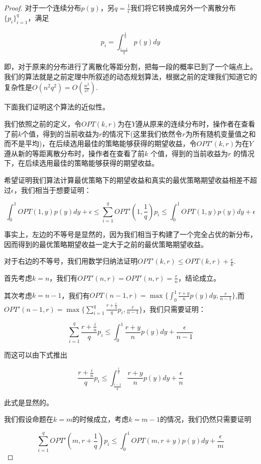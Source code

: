 \documentclass[bachelor]{thuthesis}
\begin{document}
\begin{proof}

对于一个连续分布$p(y)$，另$q=\frac{1}{\epsilon}$我们将它转换成另外一个离散分布$\{p_i\}_{i=1}^{q}$，满足

\[p_i=\int_{\frac{i-1}{q}}^{\frac{i}{q}}p(y)dy\]

即，对于原来的分布进行了离散化等距分割，把每一段的概率已到了一个端点上。我们的算法就是之前定理中所叙述的动态规划算法，根据之前的定理我们知道它的复杂性是$O(n^2q^2)=O(\frac{n^2}{\epsilon^2})$.

下面我们证明这个算法的近似性。

我们依照之前的定义，令$OPT(k,r)$为在$Y$遵从原来的连续分布时，操作者在查看了前$k$个值，得到的当前收益为$r$的情况下(这里我们依然令$r$为所有随机变量值之和而不是平均)，在后续选用最佳的策略能够获得的期望收益，令$OPT'(k,r)$为在$Y$遵从新的等距离散分布时，操作者在查看了前$k$ 个值，得到的当前收益为$r$ 的情况下，在后续选用最佳的策略能够获得的期望收益。

希望证明我们算法计算最优策略下的期望收益和真实的最优策略期望收益相差不超过$\epsilon$，我们相当于想要证明：

\[\int_{0}^{1}OPT(1,y)p(y)dy+\epsilon\le \sum_{i=1}^{q}OPT'(1,\frac{1}{q})p_i\le \int_{0}^{1}OPT(1,y)p(y)dy+\epsilon\]

事实上，左边的不等号是显然的，因为我们相当于构建了一个完全占优的新分布，因而得到的最优策略期望收益一定大于之前的最优策略期望收益。

对于右边的不等号，我们用数学归纳法证明$OPT'(k,r)\le OPT(k,r)+\frac{\epsilon}{k}$.

首先考虑$k=n$，我们有$OPT'(n,r)=OPT'(n,r)=\frac{r}{n}$，结论成立。

其次考虑$k=n-1$，我们有$OPT(n-1,r)=\max\{\int_{0}^{1}\frac{r+y}{n}p(y)dy,\frac{r}{n-1}\}$,而
$OPT'(n-1,r)=\max\{\sum_{i=1}^{q}\frac{r+\frac{i}{q}}{q}p_i,\frac{r}{n-1}\}$，我们只需要证明：

\[\sum_{i=1}^{q}\frac{r+\frac{i}{n}}{q}p_i\le \int_{0}^{1}\frac{r+y}{n}p(y)dy+\frac{\epsilon}{n-1}\]

而这可以由下式推出

\[\frac{r+\frac{i}{n}}{q}p_i\le \int_{\frac{i-1}{q}}^{\frac{i}{q}}\frac{r+y}{n}p(y)dy+\frac{\epsilon}{n}\]

此式是显然的。

我们假设命题在$k=m$的时候成立，考虑$k=m-1$的情况，我们仍然只需要证明

\[\sum_{i=1}^{q}OPT'(m,r+\frac{1}{q})p_i\le \int_{0}^{1}OPT(m,r+y)p(y)dy+\frac{\epsilon}{m}\]


\end{proof}
\end{document}
